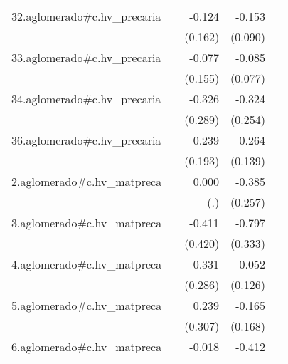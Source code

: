 {\begin{longtable}{l*{4}{D{.}{.}{-1}}}
\addlinespace
32.aglomerado#c.hv\_precaria&                     &      -0.124         &      -0.153         &                     \\
            &                     &     (0.162)         &     (0.090)         &                     \\
\addlinespace
33.aglomerado#c.hv\_precaria&                     &      -0.077         &      -0.085         &                     \\
            &                     &     (0.155)         &     (0.077)         &                     \\
\addlinespace
34.aglomerado#c.hv\_precaria&                     &      -0.326         &      -0.324         &                     \\
            &                     &     (0.289)         &     (0.254)         &                     \\
\addlinespace
36.aglomerado#c.hv\_precaria&                     &      -0.239         &      -0.264         &                     \\
            &                     &     (0.193)         &     (0.139)         &                     \\
\addlinespace
2.aglomerado#c.hv\_matpreca&                     &       0.000         &      -0.385         &                     \\
            &                     &         (.)         &     (0.257)         &                     \\
\addlinespace
3.aglomerado#c.hv\_matpreca&                     &      -0.411         &      -0.797\sym{*}  &                     \\
            &                     &     (0.420)         &     (0.333)         &                     \\
\addlinespace
4.aglomerado#c.hv\_matpreca&                     &       0.331         &      -0.052         &                     \\
            &                     &     (0.286)         &     (0.126)         &                     \\
\addlinespace
5.aglomerado#c.hv\_matpreca&                     &       0.239         &      -0.165         &                     \\
            &                     &     (0.307)         &     (0.168)         &                     \\
\addlinespace
6.aglomerado#c.hv\_matpreca&                     &      -0.018         &      -0.412         &                     \\

\end{longtable}}
